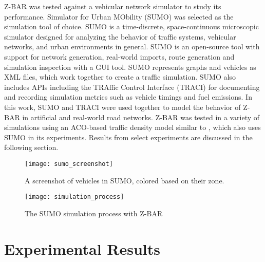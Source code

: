\documentclass[12pt,conference]{IEEEtran}
\begin{document}
Z-BAR was tested against a vehicular network simulator to study its performance. Simulator for Urban MObility (SUMO) \cite{sumo} was selected as the simulation tool of choice. SUMO is a time-discrete, space-continuous microscopic simulator designed for analyzing the behavior of traffic systems, vehicular networks, and urban environments in general. SUMO is an open-source tool with support for network generation, real-world imports, route generation and simulation inspection with a GUI tool. SUMO represents graphs and vehicles as XML files, which work together to create a traffic simulation. SUMO also includes APIs including the TRAffic Control Interface (TRACI) \cite{traci} for documenting and recording simulation metrics such as vehicle timings and fuel emissions. In this work, SUMO and TRACI were used together to model the behavior of Z-BAR in artificial and real-world road networks. Z-BAR was tested in a variety of simulations using an ACO-based traffic density model similar to \cite{iaco}, which also uses SUMO in its experiments. Results from select experiments are discussed in the following section.

\begin{figure}[h]
\caption{A screenshot of vehicles in SUMO, colored based on their zone.}
\centering
\texttt{[image: sumo\_screenshot]}
\end{figure}

\begin{figure}[h]
\caption{The SUMO simulation process with Z-BAR}
\centering
\texttt{[image: simulation\_process]}
\end{figure}

\section{Experimental Results} 
\end{document}
